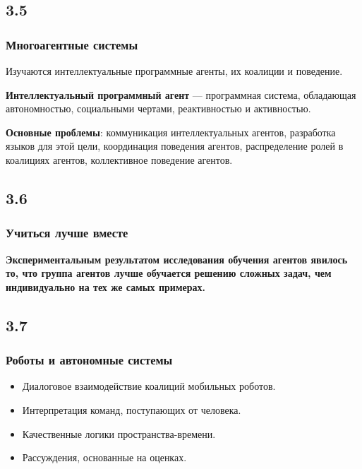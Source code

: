 \documentclass[default]{beamer}
\begin{document}
	\subsection{3.5}
	\begin{frame}
		\frametitle{Многоагентные системы}
		
		Изучаются интеллектуальные программные агенты, их коалиции и поведение.
		
		\par\medskip
		\textbf{Интеллектуальный программный  агент} --- программная система, обладающая автономностью, социальными чертами, реактивностью и активностью.
		
		\par\medskip
		\textbf{Основные проблемы}: коммуникация интеллектуальных агентов, разработка языков для этой цели, координация поведения  агентов, распределение ролей в коалициях агентов, коллективное поведение агентов.
	\end{frame}

	\subsection{3.6}
	\begin{frame}
		\frametitle{Учиться лучше вместе}
		\Large 
		\textbf{Экспериментальным результатом исследования обучения агентов явилось то, что группа агентов лучше обучается решению сложных задач, чем индивидуально на тех же самых примерах.} 
		
	\end{frame}

	\subsection{3.7}
	\begin{frame}
		\frametitle{Роботы и автономные системы}
		\Large
		\begin{itemize}
			\item Диалоговое взаимодействие коалиций мобильных роботов.
			\item Интерпретация команд, поступающих от человека.
			
			\item Качественные логики пространства-времени.
			
			\item Рассуждения, основанные на оценках.
			
		\end{itemize}
		
	\end{frame}
\end{document}
